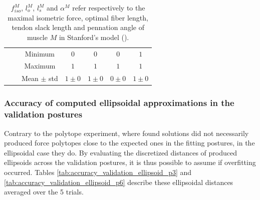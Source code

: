 \begin{table}[!ht]
\begin{tabular}{|c|c|c|c|c|c|c|}
    &  & Minimum 
        & $0$ &  $0$ & $0$ &  $1$ \\
    & & Maximum 
        & $1$ &  $1$ & $1$ &  $1$ \\
    & & Mean $\pm$ std 
        & $1\pm 0$ &  $1\pm 0$ & $0\pm 0$ &  $1\pm 0$ \\
    \hline
    

    \end{tabular}
    \caption{$f_{iso}^M$, $l_o^M$, $l_s^M$ and $\alpha^M$ refer respectively to the maximal isometric force, optimal fiber length, tendon slack length and pennation angle of muscle $M$ in Stanford's model (\cite{holzbaurModelUpperExtremity2005}).}
    \label{tab:accuracy_solution_ellipsoid}
\end{table}

\clearpage
\subsubsection*{Accuracy of computed ellipsoidal approximations in the validation postures}
Contrary to the polytope experiment, where found solutions did not necessarily produced force polytopes close to the expected ones in the fitting postures, in the ellipsoidal case they do. By evaluating the discretized distances of produced ellipsoids across the validation postures, it is thus possible to assume if overfitting occurred. Tables \ref{tab:accuracy_validation_ellipsoid_p3} and \ref{tab:accuracy_validation_ellipsoid_p6} describe these ellipsoidal distances averaged over the 5 trials.

